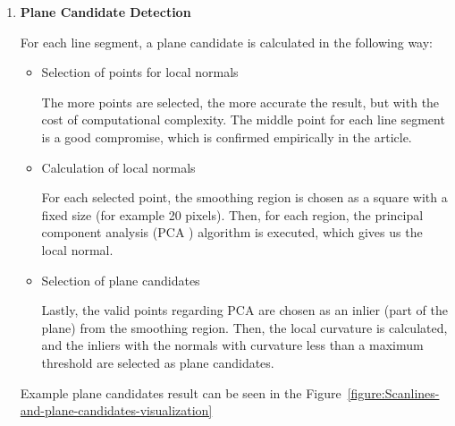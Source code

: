 \begin{enumerate}
\begin{itemize}
\end{itemize}

\item \textbf{Plane Candidate Detection}

For each line segment, a plane candidate is calculated in the following way:

\begin{itemize}

\item Selection of points for local normals

The more points are selected, the more accurate the result, but with the cost of computational complexity.
The middle point for each line segment is a good compromise, which is confirmed empirically in the article.

\item Calculation of local normals

For each selected point, the smoothing region is chosen as a square with a fixed size (for example 20 pixels).
Then, for each region, the principal component analysis (PCA \cite{articlePCAInvention}) algorithm is executed,
which gives us the local normal.

\item Selection of plane candidates

Lastly, the valid points regarding PCA are chosen as an inlier (part of the plane) from the smoothing region.
Then, the local curvature is calculated,
and the inliers with the normals with curvature less than a maximum threshold are selected as plane candidates.

\end{itemize}

Example plane candidates result can be seen in the Figure~\ref{figure:Scanlines-and-plane-candidates-visualization}


\end{enumerate}

